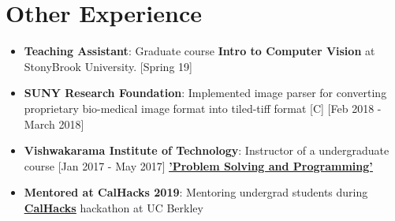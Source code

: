 \documentclass[letterpaper,11pt]{article}
\newcommand{\resumeItem}[2]{
  \item\small{
    \textbf{#1}{: #2 \vspace{-2pt}}
  }
}
\newcommand{\resumeSubItem}[2]{\resumeItem{#1}{#2}\vspace{-1pt}}
\newcommand{\resumeItemListStart}{\begin{itemize}}
\newcommand{\resumeItemListEnd}{\end{itemize}\vspace{-5pt}}
\begin{document}
\section{Other Experience}
\resumeItemListStart
\resumeSubItem{Teaching Assistant}{Graduate course \textbf{Intro to Computer Vision} at StonyBrook University. [Spring 19]}
\resumeSubItem{SUNY Research Foundation}{Implemented image parser for converting proprietary bio-medical image format into tiled-tiff format [C] [Feb 2018 - March 2018]}
\resumeSubItem{{Vishwakarama Institute of Technology}} {Instructor of a undergraduate course [Jan 2017 - May 2017] \href{https://www.hackerrank.com/coding-puzzles/}{\textbf{\underline{'Problem Solving and Programming'}}}}
\resumeSubItem{Mentored at CalHacks 2019}{Mentoring undergrad students during \href{https://calhacks.io/}{\textbf{\underline{CalHacks}}} hackathon at UC Berkley}
\resumeItemListEnd



\end{document}
